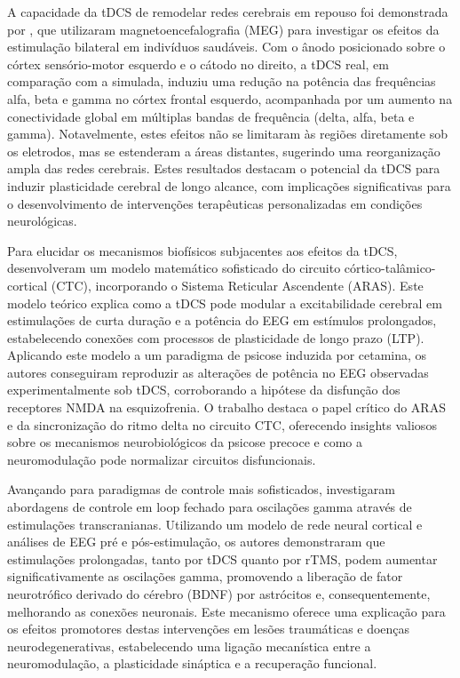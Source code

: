 A capacidade da tDCS de remodelar redes cerebrais em repouso foi demonstrada por , que utilizaram magnetoencefalografia (MEG) para investigar os efeitos da estimulação bilateral em indivíduos saudáveis. Com o ânodo posicionado sobre o córtex sensório-motor esquerdo e o cátodo no direito, a tDCS real, em comparação com a simulada, induziu uma redução na potência das frequências alfa, beta e gamma no córtex frontal esquerdo, acompanhada por um aumento na conectividade global em múltiplas bandas de frequência (delta, alfa, beta e gamma). Notavelmente, estes efeitos não se limitaram às regiões diretamente sob os eletrodos, mas se estenderam a áreas distantes, sugerindo uma reorganização ampla das redes cerebrais. Estes resultados destacam o potencial da tDCS para induzir plasticidade cerebral de longo alcance, com implicações significativas para o desenvolvimento de intervenções terapêuticas personalizadas em condições neurológicas.

Para elucidar os mecanismos biofísicos subjacentes aos efeitos da tDCS,  desenvolveram um modelo matemático sofisticado do circuito córtico-talâmico-cortical (CTC), incorporando o Sistema Reticular Ascendente (ARAS). Este modelo teórico explica como a tDCS pode modular a excitabilidade cerebral em estimulações de curta duração e a potência do EEG em estímulos prolongados, estabelecendo conexões com processos de plasticidade de longo prazo (LTP). Aplicando este modelo a um paradigma de psicose induzida por cetamina, os autores conseguiram reproduzir as alterações de potência no EEG observadas experimentalmente sob tDCS, corroborando a hipótese da disfunção dos receptores NMDA na esquizofrenia. O trabalho destaca o papel crítico do ARAS e da sincronização do ritmo delta no circuito CTC, oferecendo insights valiosos sobre os mecanismos neurobiológicos da psicose precoce e como a neuromodulação pode normalizar circuitos disfuncionais.

Avançando para paradigmas de controle mais sofisticados,  investigaram abordagens de controle em loop fechado para oscilações gamma através de estimulações transcranianas. Utilizando um modelo de rede neural cortical e análises de EEG pré e pós-estimulação, os autores demonstraram que estimulações prolongadas, tanto por tDCS quanto por rTMS, podem aumentar significativamente as oscilações gamma, promovendo a liberação de fator neurotrófico derivado do cérebro (BDNF) por astrócitos e, consequentemente, melhorando as conexões neuronais. Este mecanismo oferece uma explicação para os efeitos promotores destas intervenções em lesões traumáticas e doenças neurodegenerativas, estabelecendo uma ligação mecanística entre a neuromodulação, a plasticidade sináptica e a recuperação funcional.

